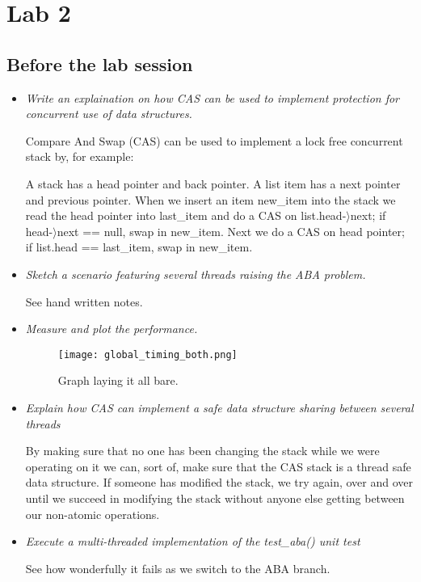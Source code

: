 \documentclass[a4paper,12pt]{article}
\begin{document}
\section{Lab 2}
\subsection{Before the lab session}

\begin{itemize}
\item \textit{Write an explaination on how CAS can be used to implement protection for concurrent use of data structures.}

  Compare And Swap (CAS) can be used to implement a lock free concurrent stack by, for example:

  A stack has a head pointer and back pointer. A list item has a next pointer and previous pointer. When we insert an item new\_item into the stack we read the head pointer into last\_item and do a CAS on list.head-$\rangle$next; if head-$\rangle$next == null, swap in new\_item. Next we do a CAS on head pointer; if list.head == last\_item, swap in new\_item.


\item \textit{Sketch a scenario featuring several threads raising the ABA problem.}

  See hand written notes.


\item \textit{Measure and plot the performance.}

\begin{figure}[h]
  \centering
  \texttt{[image: global\_timing\_both.png]}
  \caption{Graph laying it all bare.}
\end{figure}


\item \textit{Explain how CAS can implement a safe data structure sharing between several threads}

By making sure that no one has been changing the stack while we were operating on it we can, sort of, make sure that the CAS stack is a thread safe data structure. If someone has modified the stack, we try again, over and over until we succeed in modifying the stack without anyone else getting between our non-atomic operations.


\item \textit{Execute a multi-threaded implementation of the test\_aba() unit test}

See how wonderfully it fails as we switch to the ABA branch.


\end{itemize}
\end{document}
